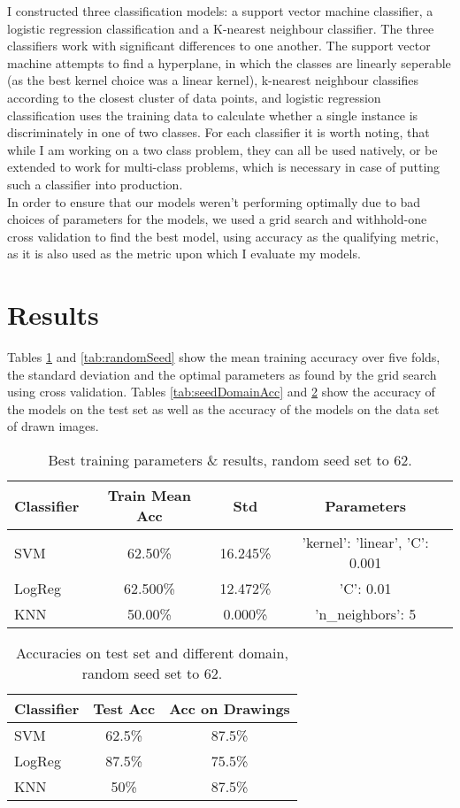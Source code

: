 \documentclass[11pt, a4paper]{article}
\begin{document}
I constructed three classification models: a support vector machine classifier, a logistic regression classification and a K-nearest neighbour classifier. The three classifiers work with significant differences to one another. The support vector machine attempts to find a hyperplane, in which the classes are linearly seperable (as the best kernel choice was a linear kernel), k-nearest neighbour classifies according to the closest cluster of data points, and logistic regression classification uses the training data to calculate whether a single instance is discriminately in one of two classes. For each classifier it is worth noting, that while I am working on a two class problem, they can all be used natively, or be extended to work for multi-class problems, which is necessary in case of putting such a classifier into production.\\
In order to ensure that our models weren't performing optimally due to bad choices of parameters for the models, we used a grid search and withhold-one cross validation to find the best model, using accuracy as the qualifying metric, as it is also used as the metric upon which I evaluate my models.\\
\section{Results}
Tables \ref{tab:TrainAcc} and \ref{tab:randomSeed} show the mean training accuracy over five folds, the standard deviation and the optimal parameters as found by the grid search using cross validation. Tables \ref{tab:seedDomainAcc} and \ref{tab:testDomainAcc} show the accuracy of the models on the test set as well as the accuracy of the models on the data set of drawn images. \\

\begin{table}[h]
  \centering
  \small
  \setlength\tabcolsep{2pt}
    \begin{tabular}{l|ccc}
    Classifier & Train Mean Acc & Std      & Parameters                     \\\hline
    SVM        & 62.50\%        & 16.245\% & 'kernel': 'linear', 'C': 0.001 \\
    LogReg     & 62.500\%       & 12.472\% & 'C': 0.01                      \\
    KNN        & 50.00\%        & 0.000\%  & 'n\_neighbors': 5
    \end{tabular}
  \caption{Best training parameters \& results, random seed set to 62.}
  \label{tab:TrainAcc}
\end{table}
\begin{table}[h]
  \centering
    \begin{tabular}{l|cc}
    Classifier & Test Acc & Acc on Drawings \\\hline
    SVM        & 62.5\%   & 87.5\%          \\
    LogReg     & 87.5\%   & 75.5\%          \\
    KNN        & 50\%     & 87.5\%
    \end{tabular}
  \caption{Accuracies on test set and different domain, random seed set to 62.}
  \label{tab:testDomainAcc}
\end{table}
\end{document}
